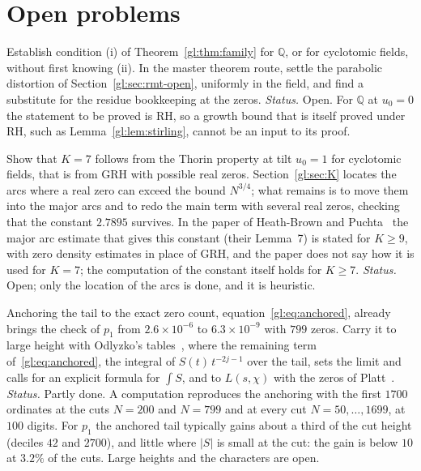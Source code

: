 \section{Open problems}\label{gl:sec:op}

\begin{problem}\label{gl:op:direct}
Establish condition (i) of Theorem~\ref{gl:thm:family} for $\mathbb Q$, or for cyclotomic fields, without first knowing (ii). In the master theorem route, settle the parabolic distortion of Section~\ref{gl:sec:rmt-open}, uniformly in the field, and find a substitute for the residue bookkeeping at the zeros. \emph{Status.} Open. For $\mathbb Q$ at $u_0=0$ the statement to be proved is RH, so a growth bound that is itself proved under RH, such as Lemma~\ref{gl:lem:stirling}, cannot be an input to its proof.
\end{problem}

\begin{problem}\label{gl:op:exceptional}
Show that $K=7$ follows from the Thorin property at tilt $u_0=1$ for cyclotomic fields, that is from GRH with possible real zeros. Section~\ref{gl:sec:K} locates the arcs where a real zero can exceed the bound $N^{3/4}$; what remains is to move them into the major arcs and to redo the main term with several real zeros, checking that the constant $2.7895$ survives. In the paper of Heath-Brown and Puchta~\cite{HBP02} the major arc estimate that gives this constant (their Lemma~7) is stated for $K\ge9$, with zero density estimates in place of GRH, and the paper does not say how it is used for $K=7$; the computation of the constant itself holds for $K\ge7$. \emph{Status.} Open; only the location of the arcs is done, and it is heuristic.
\end{problem}

\begin{problem}\label{gl:op:numerics}
Anchoring the tail to the exact zero count, equation~\eqref{gl:eq:anchored}, already brings the check of $p_1$ from $2.6\times10^{-6}$ to $6.3\times10^{-9}$ with $799$ zeros. Carry it to large height with Odlyzko's tables~\cite{OdlyzkoTables}, where the remaining term of~\eqref{gl:eq:anchored}, the integral of $S(t)\,t^{-2j-1}$ over the tail, sets the limit and calls for an explicit formula for $\int S$, and to $L(s,\chi)$ with the zeros of Platt~\cite{Platt16}. \emph{Status.} Partly done. A computation reproduces the anchoring with the first $1700$ ordinates at the cuts $N=200$ and $N=799$ and at every cut $N=50,\dots,1699$, at $100$ digits. For $p_1$ the anchored tail typically gains about a third of the cut height (deciles $42$ and $2700$), and little where $|S|$ is small at the cut: the gain is below $10$ at $3.2\%$ of the cuts. Large heights and the characters are open.
\end{problem}

